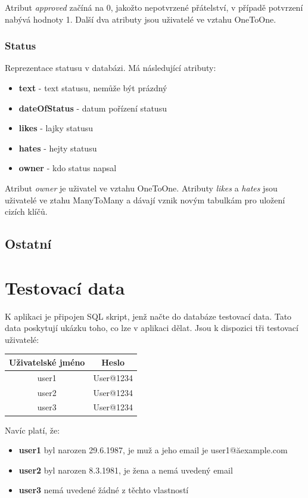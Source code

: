 \documentclass[
12pt,
a4paper,
pdftex,
czech,
titlepage
]{report}
\begin{document}
Atribut \textit{approved} začíná na 0, jakožto nepotvrzené přátelství, v případě potvrzení nabývá hodnoty 1. Další dva atributy jsou uživatelé ve vztahu OneToOne.


\subsection{Status}

Reprezentace statusu v databázi. Má následující atributy:

\begin{itemize}
\item \textbf{text} - text statusu, nemůže být prázdný
\item \textbf{dateOfStatus} - datum pořízení statusu
\item \textbf{likes} - lajky statusu
\item \textbf{hates} - hejty statusu
\item \textbf{owner} - kdo status napsal
\end{itemize}

Atribut \textit{owner} je uživatel ve vztahu OneToOne. Atributy \textit{likes} a \textit{hates} jsou uživatelé ve ztahu ManyToMany a dávají vznik novým tabulkám pro uložení cizích klíčů.

\section{Ostatní}

\chapter{Testovací data}

K aplikaci je připojen SQL skript, jenž načte do databáze testovací data. Tato data poskytují ukázku toho, co lze v aplikaci dělat. Jsou k dispozici tři testovací uživatelé:

\begin{center}
\begin{tabular}{| c | c | }
\hline
	\textbf{Uživatelské jméno} & \textbf{Heslo} \\
	\hline
  user1 & User@1234  \\
  \hline
  user2 & User@1234  \\
  \hline
  user3 & User@1234  \\
  \hline
\end{tabular}
\end{center}

Navíc platí, že:
\begin{itemize}
\item \textbf{user1} byl narozen 29.6.1987, je muž a jeho email je user1@ăexample.com
\item \textbf{user2} byl narozen 8.3.1981, je žena a nemá uvedený email
\item \textbf{user3} nemá uvedené žádné z těchto vlastností
\end{itemize}
\end{document}
